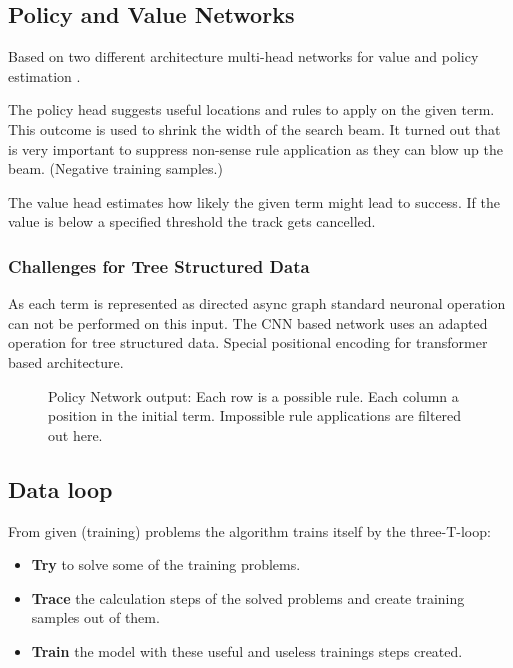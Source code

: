 \documentclass{scrartcl}
\begin{document}
\subsection{Policy and Value Networks}

Based on two different architecture multi-head networks for value and policy estimation \cite{44806}.

The policy head suggests useful locations and rules to apply on the given term. This outcome is used to shrink the width of the search beam.
It turned out that is very important to suppress non-sense rule application as they can blow up the beam. (Negative training samples.)

The value head estimates how likely the given term might lead to success. If the value is below a specified threshold the track gets cancelled.

\subsubsection{Challenges for Tree Structured Data}
As each term is represented as directed async graph standard neuronal operation can not be performed on this input.
The CNN based network uses an adapted operation for tree structured data.
Special positional encoding for transformer based architecture.

\begin{figure}[!htbp]
	\centering
	
	\caption{Policy Network output: Each row is a possible rule. Each column a position in the initial term. Impossible rule applications are filtered out here.} \label{fig:M1}
\end{figure}

\subsection{Data loop}

From given (training) problems the algorithm trains itself by the three-T-loop: 

\begin{itemize}
	\item \textbf{Try} to solve some of the training problems.
	\item \textbf{Trace} the calculation steps of the solved problems and create training samples out of them.
	\item \textbf{Train} the model with these useful and useless trainings steps created.
\end{itemize}
\end{document}
